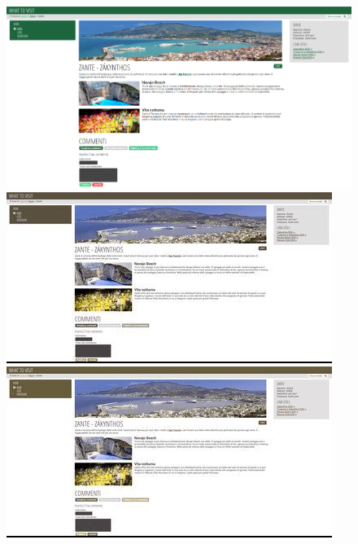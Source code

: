 \begin{figure}[H]
\begin{minipage}{0.45\textwidth}
\includegraphics[width=\linewidth]{images/screen/zante.png}
\end{minipage}
\hspace{\fill}
\begin{minipage}{0.45\textwidth}
\includegraphics[width=\linewidth]{images/screen/deuteranope.jpg}
\end{minipage}
\vspace*{0.5cm}
\begin{minipage}{0.45\textwidth}
\includegraphics[width=\linewidth]{images/screen/protanope.jpg}

\end{minipage}
\end{figure}
